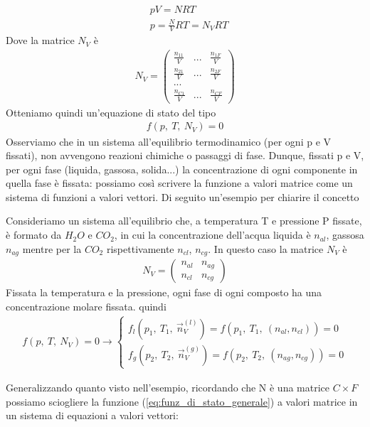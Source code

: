 \documentclass[
10pt, %
a4paper, %
oneside, %
headinclude,footinclude, %
BCOR5mm, %
]{scrartcl}
\begin{document}
\begin{align*}
	&pV = NRT\\
	&p = \frac{N}{V} RT = N_V R T
\end{align*}
Dove la matrice \(N_V\) è
\begin{align*}
	N_V = \begin{pmatrix}
		\frac{n_{11}}{V}&...&\frac{n_{1F}}{V}\\
		\frac{n_{21}}{V}&...&\frac{n_{2F}}{V}\\
		...&&\\
		\frac{n_{C1}}{V}&...&\frac{n_{CF}}{V}
	\end{pmatrix}
\end{align*}
Otteniamo quindi un'equazione di stato del tipo
\begin{align}\label{eq:funz_di_stato_generale}
	f(p,\ T,\ N_V)= 0
\end{align}
Osserviamo che in un sistema all'equilibrio termodinamico (per ogni p e V fissati), non avvengono reazioni chimiche o passaggi di fase. Dunque, fissati p e V, per ogni fase (liquida, gassosa, solida...) la concentrazione di ogni componente in quella fase è fissata: possiamo così scrivere la funzione a valori matrice come un sistema di funzioni a valori vettori. Di seguito un'esempio per chiarire il concetto
\begin{exercise}[Esempio]
	Consideriamo un sistema all'equilibrio che, a temperatura T e pressione P fissate, è formato da \(H_2O\) e \(CO_2\), in cui la concentrazione dell'acqua liquida è \(n_{al}\), gassosa \(n_{ag}\) mentre per la \(CO_2\) rispettivamente \(n_{cl}\), \(n_{cg}\). In questo caso la matrice \(N_V\) è
	\begin{align*}
		N_V = \begin{pmatrix}
			n_{al}& n_{ag}\\
			n_{cl}& n_{cg}
		\end{pmatrix}
	\end{align*}
	Fissata la temperatura e la pressione, ogni fase di ogni composto ha una concentrazione molare fissata. quindi
	\begin{align*}
		f(p,\ T,\ N_V)=0 \rightarrow
		\begin{cases}
			f_{l}(p_1,\ T_1,\ \vec{n}_V^{(l)})=f(p_1,\ T_1,\ (n_{al}, n_{cl}))=0\\
			f_{g}(p_2,\ T_2,\ \vec{n}_V^{(g)})=f(p_2,\ T_2,\ (n_{ag}, n_{cg}))=0
		\end{cases}
	\end{align*}
\end{exercise}
Generalizzando quanto visto nell'esempio, ricordando che N è una matrice \(C \times F\) possiamo sciogliere la funzione (\ref{eq:funz_di_stato_generale}) a valori matrice in un sistema di equazioni a valori vettori:
\end{document}
